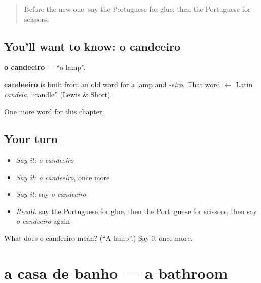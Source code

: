 \label{lesson:PT-C98-candeeiro}



\begin{quote}
Before the new one: say the Portuguese for glue, then the Portuguese for scissors.
\end{quote}

\subsection*{You'll want to know: o candeeiro}
\textbf{o candeeiro} — \textquotedblleft{}a lamp\textquotedblright{}.

\begin{cousinweb}
\textbf{candeeiro} is built from an old word for a lamp and \emph{-eiro}. That word $\leftarrow$ Latin \emph{candela}, \textquotedblleft{}candle\textquotedblright{} (Lewis \& Short).
\end{cousinweb}

\begin{grammarlens}[title={What you've built}]
One more word for this chapter.
\end{grammarlens}

\subsection*{Your turn}
\begin{itemize}
\raggedright
  \item \emph{Say it:} \emph{o candeeiro}
  \item \emph{Say it:} \emph{o candeeiro}, once more
  \item \emph{Say it:} say \emph{o candeeiro}
  \item \emph{Recall:} say the Portuguese for glue, then the Portuguese for scissors, then say \emph{o candeeiro} again
\end{itemize}

\begin{tcolorbox}[breakable,colback=teal!4,colframe=teal!35!black,title={Before you move on}]
What does o candeeiro mean? (\textquotedblleft{}A lamp\textquotedblright{}.) Say it once more.
\end{tcolorbox}
\section[a casa de banho]{a casa de banho — a bathroom}

\label{lesson:PT-C98-casa-de-banho}



